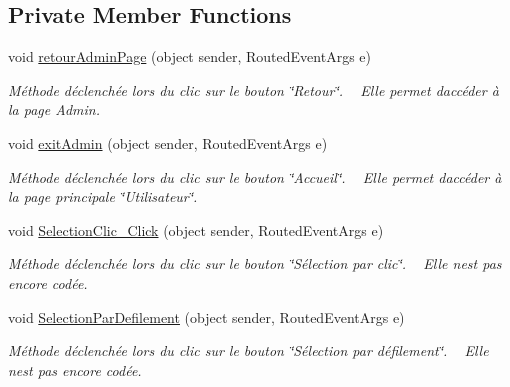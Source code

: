 \subsection*{Private Member Functions}
\begin{DoxyCompactItemize}
\item 
void \hyperlink{class_my_domotik_1_1_reglages_mode_selection_a2b986b0214fa1450755cab52823f66e1}{retour\+Admin\+Page} (object sender, Routed\+Event\+Args e)
\begin{DoxyCompactList}\small\item\em Méthode déclenchée lors du clic sur le bouton \char`\"{}\+Retour\char`\"{}. ~\newline
Elle permet d\textquotesingle{}accéder à la page Admin. \end{DoxyCompactList}\item 
void \hyperlink{class_my_domotik_1_1_reglages_mode_selection_a4327cf7d9c4086b6e702174da823d836}{exit\+Admin} (object sender, Routed\+Event\+Args e)
\begin{DoxyCompactList}\small\item\em Méthode déclenchée lors du clic sur le bouton \char`\"{}\+Accueil\char`\"{}. ~\newline
Elle permet d\textquotesingle{}accéder à la page principale \char`\"{}\+Utilisateur\char`\"{}. \end{DoxyCompactList}\item 
void \hyperlink{class_my_domotik_1_1_reglages_mode_selection_a5c2daff36531d22005143856dfc7773b}{Selection\+Clic\+\_\+\+Click} (object sender, Routed\+Event\+Args e)
\begin{DoxyCompactList}\small\item\em Méthode déclenchée lors du clic sur le bouton \char`\"{}\+Sélection par clic\char`\"{}. ~\newline
Elle n\textquotesingle{}est pas encore codée. \end{DoxyCompactList}\item 
void \hyperlink{class_my_domotik_1_1_reglages_mode_selection_a81e16f6b5b0d9462ea28ce6abb0550cc}{Selection\+Par\+Defilement} (object sender, Routed\+Event\+Args e)
\begin{DoxyCompactList}\small\item\em Méthode déclenchée lors du clic sur le bouton \char`\"{}\+Sélection par défilement\char`\"{}. ~\newline
Elle n\textquotesingle{}est pas encore codée. \end{DoxyCompactList}\end{DoxyCompactItemize}


